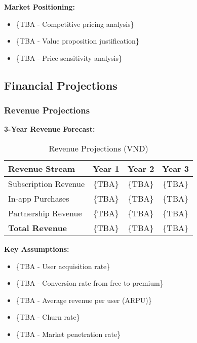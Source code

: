 \textbf{Market Positioning:}
\begin{itemize}
    \item \{TBA - Competitive pricing analysis\}
    \item \{TBA - Value proposition justification\}
    \item \{TBA - Price sensitivity analysis\}
\end{itemize}

\subsection{Financial Projections}
\subsubsection{Revenue Projections}
\textbf{3-Year Revenue Forecast:}
\begin{table}[h]
\centering
\begin{tabular}{|l|c|c|c|}
\hline
\textbf{Revenue Stream} & \textbf{Year 1} & \textbf{Year 2} & \textbf{Year 3} \\
\hline
Subscription Revenue & \{TBA\} & \{TBA\} & \{TBA\} \\
In-app Purchases & \{TBA\} & \{TBA\} & \{TBA\} \\
Partnership Revenue & \{TBA\} & \{TBA\} & \{TBA\} \\
\hline
\textbf{Total Revenue} & \{TBA\} & \{TBA\} & \{TBA\} \\
\hline
\end{tabular}
\caption{Revenue Projections (VND)}
\end{table}

\textbf{Key Assumptions:}
\begin{itemize}
    \item \{TBA - User acquisition rate\}
    \item \{TBA - Conversion rate from free to premium\}
    \item \{TBA - Average revenue per user (ARPU)\}
    \item \{TBA - Churn rate\}
    \item \{TBA - Market penetration rate\}
\end{itemize}

